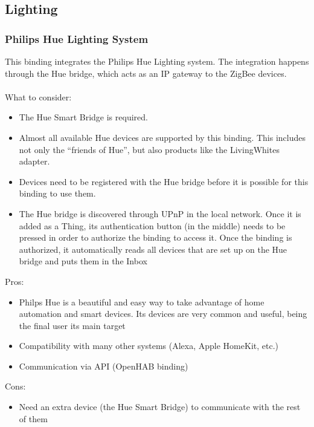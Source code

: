 \subsection{Lighting}

\subsubsection{Philips Hue Lighting System}
This binding integrates the Philips Hue Lighting system. The integration happens through the Hue bridge, which
acts as an IP gateway to the ZigBee devices.\\~\\
What to consider:
\begin{itemize}
	\item The Hue Smart Bridge is required.
	\item Almost all available Hue devices are supported by this binding. This includes not only the “friends of Hue”,
	but also products like the LivingWhites adapter.
	\item Devices need to be registered with the Hue bridge before it is possible for this binding to use them.
	\item The Hue bridge is discovered through UPnP in the local network. Once it is added as a Thing, its authentication
	button (in the middle) needs to be pressed in order to authorize the binding to access it. Once the binding is authorized,
	it automatically reads all devices that are set up on the Hue bridge and puts them in the Inbox
\end{itemize}
Pros:
\begin{itemize}
	\item Philps Hue is a beautiful and easy way to take advantage of home automation and smart devices. Its devices are very
	common and useful, being the final user its main target
	\item Compatibility with many other systems (Alexa, Apple HomeKit, etc.)
	\item Communication via API (OpenHAB binding)
\end{itemize}
Cons:
\begin{itemize}
	\item Need an extra device (the Hue Smart Bridge) to communicate with the rest of them
\end{itemize}

